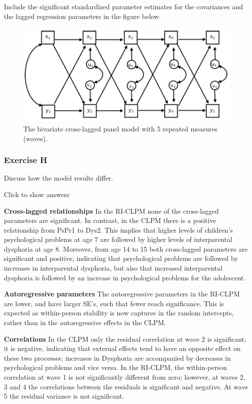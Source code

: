 \documentclass[
]{book}
\begin{document}
Include the significant standardized parameter estimates for the covariances and the lagged regression parameters in the figure below.

\begin{figure}
\centering
\includegraphics[width=5.20833in,height=\textheight]{CLPM-5waves.png}
\caption{The bivariate cross-lagged panel model with 5 repeated measures (waves).}
\end{figure}

\hypertarget{exercise-h-1}{%
\subsubsection*{Exercise H}\label{exercise-h-1}}

Discuss how the model results differ.

Click to show answers

\textbf{Cross-lagged relationships}
In the RI-CLPM none of the cross-lagged parameters are significant. In contrast, in the CLPM there is a positive relationship from PsPr1 to Dys2. This implies that higher levels of children's psychological problems at age 7 are followed by higher levels of interparental dysphoria at age 8. Moreover, from age 14 to 15 both cross-lagged parameters are significant and positive, indicating that psychological problems are followed by increases in interparental dysphoria, but also that increased interparental dysphoria is followed by an increase in psychological problems for the adolescent.

\textbf{Autoregressive parameters}
The autoregressive parameters in the RI-CLPM are lower, and have larger SE's, such that fewer reach significance. This is expected as within-person stability is now captures in the random intercepts, rather than in the autoregressive effects in the CLPM.

\textbf{Correlations}
In the CLPM only the residual correlation at wave 2 is significant; it is negative, indicating that external effects tend to have an opposite effect on these two processes; increases in Dysphoria are accompanied by decreases in psychological problems and vice versa. In the RI-CLPM, the within-person correlation at wave 1 is not significantly different from zero; however, at waves 2, 3 and 4 the correlations between the residuals is significant and negative. At wave 5 the residual variance is not significant.
\end{document}
